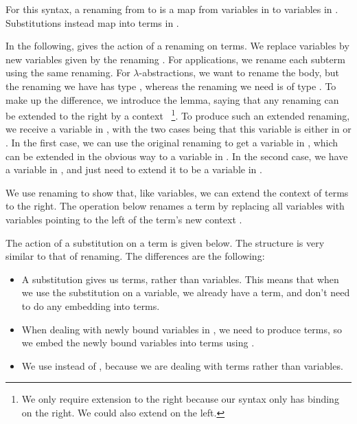 \Var{}
\Term{}

For this syntax, a renaming from \AgdaBound{$\Gamma$} to \AgdaBound{$\Delta$}
is a map from variables in \AgdaBound{$\Delta$} to variables in
\AgdaBound{$\Gamma$}.
Substitutions instead map into terms in \AgdaBound{$\Gamma$}.

\Ren{}
\Sub{}

In the following,  gives the action of a renaming on terms.
We replace variables by new variables given by the renaming \AgdaBound{$\rho$}.
For applications, we rename each subterm using the same renaming.
For $\lambda$-abstractions, we want to rename the body, but the renaming we
have has type \RenGD{}, whereas the renaming we need is of type \RenGADA{}.
To make up the difference, we introduce the  lemma,
saying that any renaming can be extended to the right by a context
\AgdaBound{$\Theta$}~\footnote{%
  We only require extension to the right because our syntax only has binding
  on the right.
  We could also extend on the left.
}.
To produce such an extended renaming, we receive a variable in \DTh{}, with the
two cases being that this variable is either in \AgdaBound{$\Delta$} or
\AgdaBound{$\Theta$}.
In the first case, we can use the original renaming \AgdaBound{$\rho$} to get
a variable in \AgdaBound{$\Gamma$}, which can be extended in the obvious way
to a variable in \GTh{}.
In the second case, we have a variable in \AgdaBound{$\Theta$}, and just need
to extend it to be a variable in \GTh{}.

\bindRen{}
\rename{}

We use renaming to show that, like variables, we can extend the context of terms
to the right.
The operation below renames a term by replacing all variables with variables
pointing to the left of the term's new context \GD{}.

\leftTerm{}

The action of a substitution on a term is given below.
The structure is very similar to that of renaming.
The differences are the following:

\begin{itemize}
  \item A substitution gives us terms, rather than variables.
        This means that when we use the substitution on a variable, we already
        have a term, and don't need to do any embedding into terms.
  \item When dealing with newly bound variables in , we
        need to produce terms, so we embed the newly bound variables into terms
        using .
  \item We use  instead of , because we
        are dealing with terms rather than variables.
\end{itemize}

